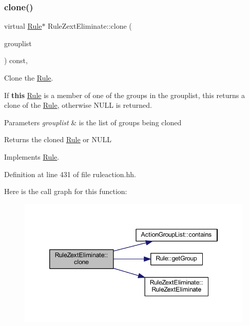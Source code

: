 \subsubsection{\texorpdfstring{clone()}{clone()}}
{\footnotesize\ttfamily virtual \mbox{\hyperlink{class_rule}{Rule}}$\ast$ Rule\+Zext\+Eliminate\+::clone (\begin{DoxyParamCaption}\item[{const \mbox{\hyperlink{class_action_group_list}{Action\+Group\+List}} \&}]{grouplist }\end{DoxyParamCaption}) const\hspace{0.3cm}{\ttfamily [inline]}, {\ttfamily [virtual]}}



Clone the \mbox{\hyperlink{class_rule}{Rule}}. 

If {\bfseries{this}} \mbox{\hyperlink{class_rule}{Rule}} is a member of one of the groups in the grouplist, this returns a clone of the \mbox{\hyperlink{class_rule}{Rule}}, otherwise N\+U\+LL is returned. 
\begin{DoxyParams}{Parameters}
{\em grouplist} & is the list of groups being cloned \\
\hline
\end{DoxyParams}
\begin{DoxyReturn}{Returns}
the cloned \mbox{\hyperlink{class_rule}{Rule}} or N\+U\+LL 
\end{DoxyReturn}


Implements \mbox{\hyperlink{class_rule_a70de90a76461bfa7ea0b575ce3c11e4d}{Rule}}.



Definition at line 431 of file ruleaction.\+hh.

Here is the call graph for this function\+:
\nopagebreak
\begin{figure}[H]
\begin{center}
\leavevmode
\includegraphics[width=346pt]{class_rule_zext_eliminate_aa695ebff0d43a28e791e03bbfaf792b7_cgraph}
\end{center}
\end{figure}
\mbox{\label{class_rule_zext_eliminate_ada5f7ed4da2939db43d55c3982702d11}} 
